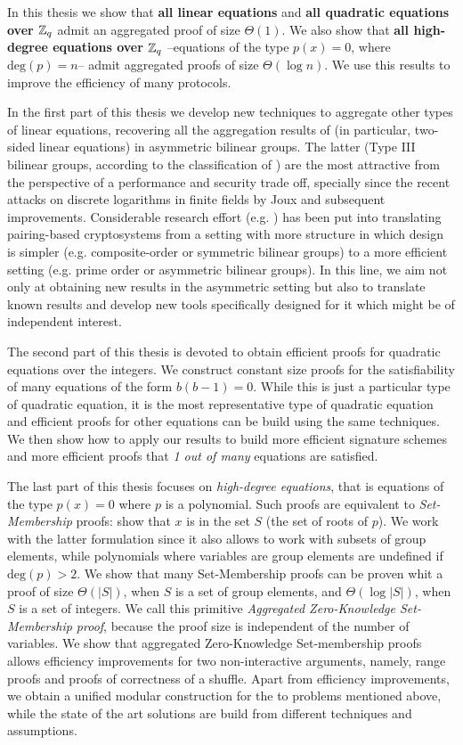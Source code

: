 In this thesis we show that \textbf{all linear equations} and \textbf{all quadratic equations over $\mathbb{Z}_q$} admit an aggregated proof of size $\Theta(1)$. We also show that \textbf{all high-degree equations over $\mathbb{Z}_q$} --equations of the type $p(x)=0$, where $\mathrm{deg}(p)=n$-- admit aggregated proofs of size $\Theta(\log n)$.  We use this results to improve the efficiency of many protocols. 

In the first part of this thesis we develop new techniques to aggregate 
other types of linear equations, recovering all the aggregation results of \cite{C:JutRoy14} (in particular, two-sided linear equations) in asymmetric bilinear groups. The latter (Type III bilinear groups, according to the classification of \cite{DAM:GalPatSma08}) are the most 
attractive 
from the perspective of a performance and security trade off, specially since the recent attacks on discrete logarithms in finite fields by Joux \cite{SAC:Joux13} and subsequent improvements. Considerable research effort 
(e.g. \cite{C:AGOT14a,EC:Freeman10})
has been put into translating pairing-based cryptosystems from a setting with more structure in which design is simpler (e.g. composite-order or symmetric bilinear groups) to a more efficient setting (e.g. prime order or asymmetric bilinear groups). In this line, we aim not only at obtaining new results in the asymmetric setting but also to translate known results and develop new tools specifically designed for it which might be of independent interest.

The second part of this thesis is devoted to obtain efficient proofs for quadratic equations over the integers. We construct constant size proofs for the satisfiability of many equations of the form $b(b-1)=0$. While this is just a particular type of quadratic equation, it is the most representative type of quadratic equation and efficient proofs for other equations can be build using the same techniques. We then show how to apply our results to build more efficient signature schemes and more efficient proofs that \emph{1 out of many} equations are satisfied.

The last part of this thesis focuses on \emph{high-degree equations}, that is equations of the type $p(x)=0$ where $p$ is a polynomial. Such proofs are equivalent to \emph{Set-Membership} proofs: show that $x$ is in the set $S$ (the set of roots of $p$). We work with the latter formulation since it also allows to work with subsets of group elements, while polynomials where variables are group elements are undefined if $\mathrm{deg}(p)>2$. We show that many Set-Membership proofs can be proven whit a proof of size $\Theta(|S|)$, when $S$ is a set of group elements, and $\Theta(\log |S|)$, when $S$ is a set of integers. We call this primitive \emph{Aggregated Zero-Knowledge Set-Membership proof}, because the proof size is independent of the number of variables. We show that aggregated Zero-Knowledge Set-membership proofs allows efficiency improvements for two non-interactive arguments, namely, range proofs and proofs of correctness of a shuffle. Apart from efficiency improvements, we obtain a unified modular construction for the to problems mentioned above, while the state of the art solutions are build from different techniques and assumptions.
